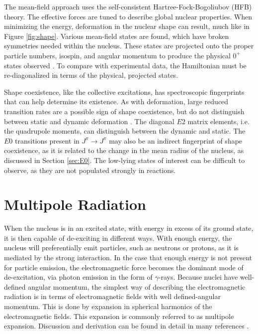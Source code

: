 The mean-field approach uses the self-consistent Hartree-Fock-Bogoliubov (HFB) theory. The effective forces are tuned to describe global nuclear properties. When minimizing the energy, deformation in the nuclear shape can result, much like in Figure \ref{fig:shape}. Various mean-field states are found, which have broken symmetries needed within the nucleus. These states are projected onto the proper particle numbers, isospin, and angular momentum to produce the physical $0^+$ states observed \citep{heyde11:_shape_coexist}. To compare with experimental data, the Hamiltonian must be re-diagonalized in terms of the physical, projected states.

Shape coexistence, like the collective excitations, has spectroscopic fingerprints that can help determine its existence. As with deformation, large reduced transition rates are a possible sign of shape coexistence, but do not distinguish between static and dynamic deformation \citep{heyde11:_shape_coexist}. The diagonal $E2$ matrix elements, i.e. the quadrupole moments, can distinguish between the dynamic and static. The $E0$ transitions present in $J^{\pi}\rightarrow J^{\pi}$ may also be an indirect fingerprint of shape coexistence, as it is related to the change in the mean radius of the nucleus, as discussed in Section \ref{sec:E0}\citep{wood99:_e0}. The low-lying states of interest can be difficult to observe, as they are not populated strongly in reactions.

\section{Multipole Radiation}
\label{sec:multipole}
When the nucleus is in an excited state, with energy in excess of its ground state, it is then capable of de-exciting in different ways. With enough energy, the nucleus will preferentially emit particles, such as neutrons or protons, as it is mediated by the strong interaction. In the case that enough energy is not present for particle emission, the electromagnetic force becomes the dominant mode of de-excitation, via photon emission in the form of $\gamma$-rays. Because nuclei have well-defined angular momentum, the simplest way of describing the electromagnetic radiation is in terms of electromagnetic fields with well defined-angular momentum. This is done by expansion in spherical harmonics of the electromagnetic fields. This expansion is commonly referred to as multipole expansion. Discussion and derivation can be found in detail in many references \citep{blatt79:_emradiation, jackson99:_emradiation, zangwill13:_emradiation, brink93:_emradiation}.

